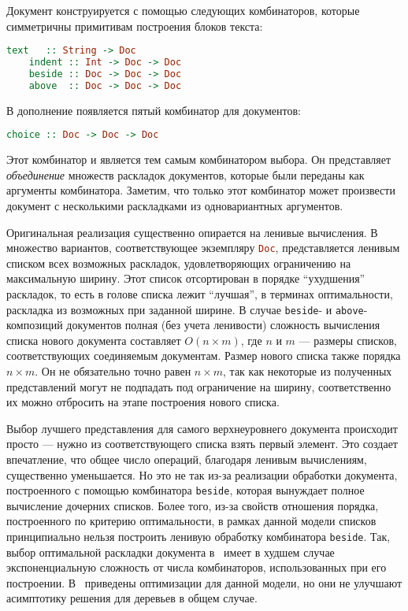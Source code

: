 Документ конструируется с помощью следующих комбинаторов, которые симметричны
примитивам построения блоков текста:
\begin{lstlisting}[language=haskell]
    text   :: String -> Doc
    indent :: Int -> Doc -> Doc
    beside :: Doc -> Doc -> Doc
    above  :: Doc -> Doc -> Doc
\end{lstlisting}

В дополнение появляется пятый комбинатор для документов:
\begin{lstlisting}[language=haskell]
    choice :: Doc -> Doc -> Doc
\end{lstlisting}

Этот комбинатор и является тем самым комбинатором выбора. Он представляет
\emph{объединение} множеств раскладок документов, которые были переданы как
аргументы комбинатора. Заметим, что только этот комбинатор может произвести
документ с несколькими раскладками из одновариантных аргументов.

Оригинальная реализация существенно опирается на ленивые вычисления. В~\cite{swierstra}
множество вариантов, соответствующее экземпляру \lstinline[language = Haskell]{Doc},
представляется ленивым списком всех возможных раскладок, удовлетворяющих ограничению
на максимальную ширину. Этот список отсортирован в порядке ``ухудшения''
раскладок, то есть в голове списка лежит ``лучшая'', в терминах оптимальности,
раскладка из возможных при заданной ширине. В случае
\lstinline{beside}- и
\lstinline{above}-композиций
документов полная (без учета ленивости) сложность вычисления списка нового документа
составляет $O(n \times m)$, где $n$ и $m$ --- размеры списков, соответствующих 
соединяемым документам. Размер нового списка также порядка $n \times m$.
Он не обязательно точно равен $n \times m$, так как некоторые из полученных
представлений могут не подпадать под ограничение на ширину, соответственно их можно
отбросить на этапе построения нового списка.

Выбор лучшего представления для самого верхнеуровнего документа происходит
просто --- нужно из соответствующего списка взять первый элемент.
Это создает впечатление, что общее число операций,
благодаря ленивым вычислениям, существенно уменьшается.
Но это не так из-за реализации обработки документа,
построенного с помощью комбинатора \lstinline[language = Haskell]{beside}, которая
вынуждает полное вычисление дочерних списков. Более того, из-за свойств отношения
порядка, построенного по критерию оптимальности, в рамках данной модели списков
принципиально нельзя построить ленивую обработку комбинатора
\lstinline[language = Haskell]{beside}.
Так, выбор оптимальной раскладки документа в~\cite{swierstra} имеет в худшем случае экспоненциальную 
сложность от числа комбинаторов, использованных при его построении.
В~\cite{swiComb} приведены оптимизации для данной модели, но они
не улучшают асимптотику решения для деревьев в общем случае.

